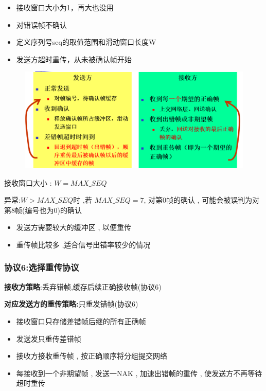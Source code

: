 \documentclass[UTF8,a4paper]{ctexart}
\begin{document}
\begin{itemize}
  \item 接收窗口大小为1，再大也没用
  \item 对错误帧不确认
  \item 定义序列号seq的取值范围和滑动窗口长度W
  \item 发送方超时重传，从未被确认帧开始
\end{itemize}

\begin{figure}[H]
  \centering
  \includegraphics[scale = 0.3]{assets/jisuanjiwangluo_f16d6.png}
\end{figure}

接收窗口大小 : $W = MAX\_SEQ$

异常:$W > MAX\_SEQ$时 ,若 $MAX\_SEQ = 7$, 对第0帧的确认 , 可能会被误判为对第8帧(编号也为0)的确认

\begin{itemize}
  \item 发送方需要较大的缓冲区 , 以便重传
  \item 重传帧比较多 ,适合信号出错率较少的情况
\end{itemize}

\subsubsection{协议6:选择重传协议}
\textbf{接收方策略}:丢弃错帧,缓存后续正确接收帧(协议6)

\textbf{对应发送方的重传策略:}只重发错帧(协议6)

\begin{itemize}
  \item 接收窗口只存储差错帧后继的所有正确帧
  \item 发送发只重传差错帧
  \item 接收方接收重传帧 , 按正确顺序将分组提交网络
  \item 每接收到一个非期望帧 , 发送一NAK , 加速出错帧的重传 , 使发送方不再等待超时重传
\end{itemize}
\end{document}
